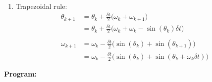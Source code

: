 \documentclass[a4paper,11pt]{report}
\begin{document}
\begin{enumerate}
\begin{enumerate}
    \item Trapezoidal rule:
    \begin{equation*}
    \begin{aligned}
    \theta_{k+1} &= \theta_{k} + \frac{\delta t}{2} \Big( \omega_{k} + \omega_{k+1} \Big) \\
                 &= \theta_{k} + \frac{\delta t}{2} \Big( \omega_{k} + \omega_{k} - \sin(\theta_{k}) \delta t \Big) \\ \\
    \omega_{k+1} &= \omega_{k} - \frac{\delta t}{2} \Big( \sin(\theta_{k}) + \sin(\theta_{k+1}) \Big) \\
                 &= \omega_{k} - \frac{\delta t}{2} \Big( \sin(\theta_{k}) + \sin(\theta_{k} + \omega_{k} \delta t) \Big)
    \end{aligned}
    \end{equation*}

    \end{enumerate}


    \textbf{Program:}
    

    \begin{figure}[ht!]
    \centering
    \resizebox{0.9\linewidth}{!}{}
    \end{figure}

    \begin{figure}[ht!]
    \centering
    \resizebox{0.9\linewidth}{!}{}
    \end{figure}
    
    \begin{figure}[ht!]
    \centering
    \resizebox{0.9\linewidth}{!}{}
    \end{figure}

    \begin{figure}[ht!]
    \centering
    \resizebox{0.9\linewidth}{!}{}
    \end{figure}

    \begin{figure}[ht!]
    \centering
    \resizebox{0.9\linewidth}{!}{}
    \end{figure}

    \begin{figure}[ht!]
    \centering
    \resizebox{0.9\linewidth}{!}{}
    \end{figure}


\end{enumerate}
\end{document}
